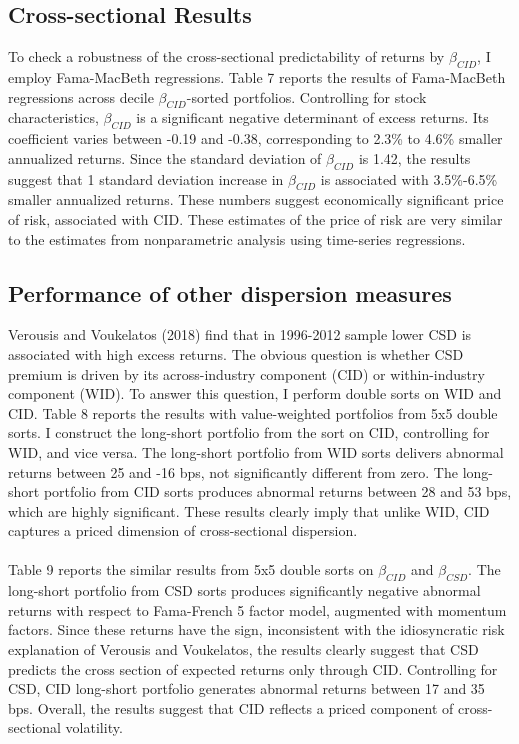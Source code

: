 \documentclass[12pt]{article}
\begin{document}
\subsection{Cross-sectional Results}

To check a robustness of the cross-sectional predictability of returns by $\beta_{CID}$, I employ Fama-MacBeth regressions. Table 7 reports the results of Fama-MacBeth regressions across decile $\beta_{CID}$-sorted portfolios. Controlling for stock characteristics, $\beta_{CID}$ is a significant negative determinant of excess returns. Its coefficient varies between -0.19 and -0.38, corresponding to 2.3\% to 4.6\% smaller annualized returns. Since the standard deviation of $\beta_{CID}$ is 1.42, the results suggest that 1 standard deviation increase in $\beta_{CID}$ is associated with 3.5\%-6.5\% smaller annualized returns. These numbers suggest economically significant price of risk, associated with CID. These estimates of the price of risk are very similar to the estimates from nonparametric analysis using time-series regressions.

\subsection{Performance of other dispersion measures}

Verousis and Voukelatos (2018) find that in 1996-2012 sample lower CSD is associated with high excess returns. The obvious question is whether CSD premium is driven by its across-industry component (CID) or within-industry component (WID). To answer this question, I perform double sorts on WID and CID. Table 8 reports the results with value-weighted portfolios from 5x5 double sorts. I construct the long-short portfolio from the sort on CID, controlling for WID, and vice versa. The long-short portfolio from WID sorts delivers abnormal returns between 25 and -16 bps, not significantly different from zero. The long-short portfolio from CID sorts produces abnormal returns between 28 and 53 bps, which are highly significant. These results clearly imply that unlike WID, CID captures a priced dimension of cross-sectional dispersion. 
\paragraph{}
Table 9 reports the similar results from 5x5 double sorts on $\beta_{CID}$ and $\beta_{CSD}$. The long-short portfolio from CSD sorts produces significantly negative abnormal returns with respect to Fama-French 5 factor model, augmented with momentum factors. Since these returns have the sign, inconsistent with the idiosyncratic risk explanation of Verousis and Voukelatos, the results clearly suggest that CSD predicts the cross section of expected returns only through CID. Controlling for CSD, CID long-short portfolio generates abnormal returns between 17 and 35 bps. Overall, the results suggest that CID reflects a priced component of cross-sectional volatility.
\end{document}
